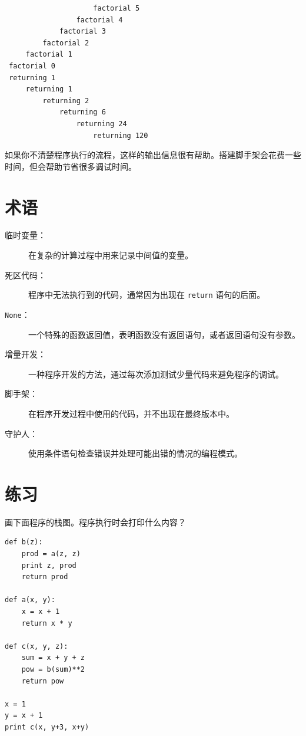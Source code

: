\beforeverb
\begin{verbatim}
                     factorial 5
                 factorial 4
             factorial 3
         factorial 2
     factorial 1
 factorial 0
 returning 1
     returning 1
         returning 2
             returning 6
                 returning 24
                     returning 120
\end{verbatim}
\afterverb
%
如果你不清楚程序执行的流程，这样的输出信息很有帮助。搭建脚手架会花费一些时间，但会帮助节省很多调试时间。


\section{术语}

\begin{description}

\item[临时变量：] 在复杂的计算过程中用来记录中间值的变量。

\item[死区代码：] 程序中无法执行到的代码，通常因为出现在 {\tt return} 语句的后面。

\item[{\tt None}：]  一个特殊的函数返回值，表明函数没有返回语句，或者返回语句没有参数。

\item[增量开发：] 一种程序开发的方法，通过每次添加测试少量代码来避免程序的调试。

\item[脚手架：] 在程序开发过程中使用的代码，并不出现在最终版本中。

\item[守护人：] 使用条件语句检查错误并处理可能出错的情况的编程模式。

\end{description}


\section{练习}

\begin{ex}

画下面程序的栈图。程序执行时会打印什么内容？

\beforeverb
\begin{verbatim}
def b(z):
    prod = a(z, z)
    print z, prod
    return prod

def a(x, y):
    x = x + 1
    return x * y

def c(x, y, z):
    sum = x + y + z
    pow = b(sum)**2
    return pow

x = 1
y = x + 1
print c(x, y+3, x+y)
\end{verbatim}
\afterverb

\end{ex}


